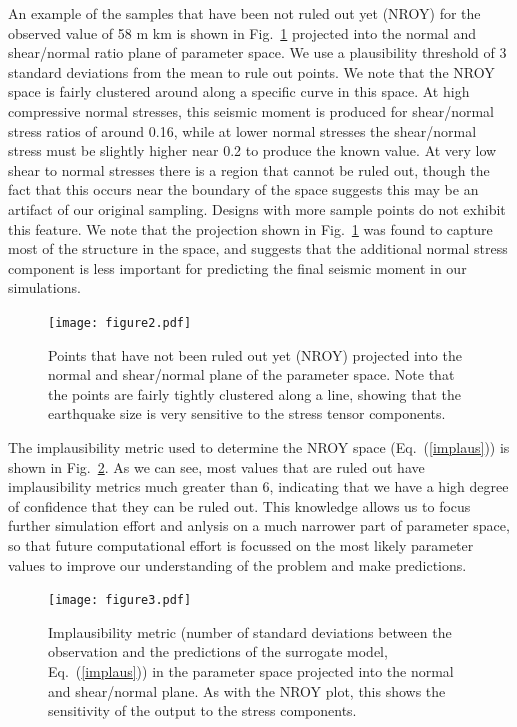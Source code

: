 \documentclass[openacc]{rstransa}%
\begin{document}
An example of the samples that have been not ruled out yet (NROY) for the observed value of 58 m km
is shown in Fig.~\ref{fig_nroy} projected into the normal and shear/normal ratio plane of parameter
space. We use a plausibility threshold of 3 standard deviations from the mean to rule out points.
We note that the NROY space is fairly clustered around along a specific curve in this space.
At high compressive normal stresses, this seismic moment is produced for shear/normal stress ratios
of around 0.16, while at lower normal stresses the shear/normal stress must be slightly higher
near 0.2 to
produce the known value. At very low shear to normal stresses there is a region that cannot be
ruled out, though the fact that this occurs near the boundary of the space suggests this may be
an artifact of our original sampling. Designs with more sample points do not exhibit this feature.
We note that the projection shown in Fig.~\ref{fig_nroy} was found to capture most of the structure
in the space, and suggests that the additional normal
stress component is less important for predicting the final seismic moment in our simulations.

\begin{figure}[!h]
\centering\texttt{[image: figure2.pdf]}
\caption{Points that have not been ruled out yet (NROY) projected into the normal and shear/normal plane of the parameter space. Note that the points are fairly tightly clustered along a line, showing that the earthquake size is very sensitive to the stress tensor components.}
\label{fig_nroy}
\end{figure}

The implausibility metric used to determine the NROY space (Eq.~(\ref{implaus})) is shown in
Fig.~\ref{fig_implausibility}. As we can see, most values that are ruled out have implausibility
metrics much greater than 6, indicating that we have a high degree of confidence that they can be
ruled out. This knowledge allows us to focus further simulation effort and anlysis on a much narrower
part of parameter space, so that future computational effort is focussed on the most likely parameter
values to improve our understanding of the problem and make predictions.

\begin{figure}[!h]
\centering\texttt{[image: figure3.pdf]}
\caption{Implausibility metric (number of standard deviations between the observation and the predictions of the surrogate model, Eq.~(\ref{implaus})) in the parameter space projected into the normal and shear/normal plane. As with the NROY plot, this shows the sensitivity of the output to the stress components.}
\label{fig_implausibility}
\end{figure}
\end{document}
